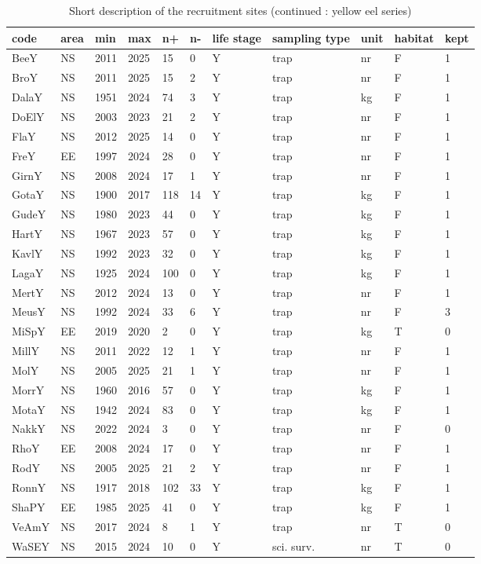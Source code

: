 \begin{table}[htbp]
\centering
\caption{Short description of the recruitment sites (continued : yellow eel series) } 
\label{statseriesY}
\begin{tabular}{p{1cm}p{1cm}p{1cm}p{1cm}p{0.8cm}p{0.8cm}p{1cm}p{2cm}p{2cm}p{1cm}p{1cm}}
  \hline
code & area & min & max & n+ & n- & life stage & sampling type & unit & habitat & kept \\ 
  \hline
BeeY & NS & 2011 & 2025 & 15 & 0 & Y & trap & nr & F & 1 \\ 
  BroY & NS & 2011 & 2025 & 15 & 2 & Y & trap & nr & F & 1 \\ 
  DalaY & NS & 1951 & 2024 & 74 & 3 & Y & trap & kg & F & 1 \\ 
  DoElY & NS & 2003 & 2023 & 21 & 2 & Y & trap & nr & F & 1 \\ 
  FlaY & NS & 2012 & 2025 & 14 & 0 & Y & trap & nr & F & 1 \\ 
  FreY & EE & 1997 & 2024 & 28 & 0 & Y & trap & nr & F & 1 \\ 
  GirnY & NS & 2008 & 2024 & 17 & 1 & Y & trap & nr & F & 1 \\ 
  GotaY & NS & 1900 & 2017 & 118 & 14 & Y & trap & kg & F & 1 \\ 
  GudeY & NS & 1980 & 2023 & 44 & 0 & Y & trap & kg & F & 1 \\ 
  HartY & NS & 1967 & 2023 & 57 & 0 & Y & trap & kg & F & 1 \\ 
  KavlY & NS & 1992 & 2023 & 32 & 0 & Y & trap & kg & F & 1 \\ 
  LagaY & NS & 1925 & 2024 & 100 & 0 & Y & trap & kg & F & 1 \\ 
  MertY & NS & 2012 & 2024 & 13 & 0 & Y & trap & nr & F & 1 \\ 
  MeusY & NS & 1992 & 2024 & 33 & 6 & Y & trap & nr & F & 3 \\ 
  MiSpY & EE & 2019 & 2020 & 2 & 0 & Y & trap & kg & T & 0 \\ 
  MillY & NS & 2011 & 2022 & 12 & 1 & Y & trap & nr & F & 1 \\ 
  MolY & NS & 2005 & 2025 & 21 & 1 & Y & trap & nr & F & 1 \\ 
  MorrY & NS & 1960 & 2016 & 57 & 0 & Y & trap & kg & F & 1 \\ 
  MotaY & NS & 1942 & 2024 & 83 & 0 & Y & trap & kg & F & 1 \\ 
  NakkY & NS & 2022 & 2024 & 3 & 0 & Y & trap & nr & F & 0 \\ 
  RhoY & EE & 2008 & 2024 & 17 & 0 & Y & trap & nr & F & 1 \\ 
  RodY & NS & 2005 & 2025 & 21 & 2 & Y & trap & nr & F & 1 \\ 
  RonnY & NS & 1917 & 2018 & 102 & 33 & Y & trap & kg & F & 1 \\ 
  ShaPY & EE & 1985 & 2025 & 41 & 0 & Y & trap & kg & F & 1 \\ 
  VeAmY & NS & 2017 & 2024 & 8 & 1 & Y & trap & nr & T & 0 \\ 
  WaSEY & NS & 2015 & 2024 & 10 & 0 & Y & sci. surv. & nr & T & 0 \\ 
   \hline
\end{tabular}
\end{table}
